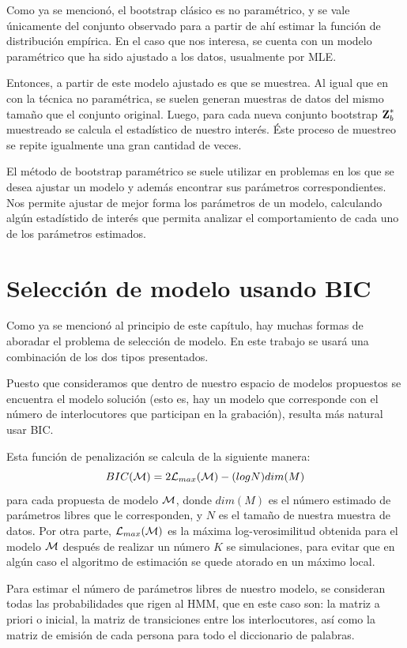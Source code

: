 Como ya se mencionó, el bootstrap clásico es no paramétrico, y se vale únicamente del conjunto observado para a partir de ahí estimar la función de distribución empírica. En el caso que nos interesa, se cuenta con un modelo paramétrico que ha sido ajustado a los datos, usualmente por \ac{MLE}. 

Entonces, a partir de este modelo ajustado es que se muestrea. Al igual que en con la técnica no paramétrica, se suelen generan muestras de datos del mismo tamaño que el conjunto original. Luego, para cada nueva conjunto bootstrap $\textbf{Z}^{*}_b$ muestreado se calcula el estadístico de nuestro interés. Éste proceso de muestreo se repite igualmente una gran cantidad de veces. 

El método de bootstrap paramétrico se suele utilizar en problemas en los que se desea ajustar un modelo y además encontrar sus parámetros correspondientes. Nos permite ajustar de mejor forma los parámetros de un modelo, calculando algún estadístido de interés que permita analizar el comportamiento de cada uno de los parámetros estimados.

\section{Selección de modelo usando BIC}

Como ya se mencionó al principio de este capítulo, hay muchas formas de aboradar el problema de selección de modelo. En este trabajo se usará una combinación de los dos tipos presentados.

Puesto que consideramos que dentro de nuestro espacio de modelos propuestos se encuentra el modelo solución (esto es, hay un modelo que corresponde con el número de interlocutores que participan en la grabación), resulta más natural usar \ac{BIC}.

Esta función de penalización se calcula de la siguiente manera: 
\begin{equation}
BIC(\mathcal{M}) = 2 \mathcal{L}_{max}(\mathcal{M}) - (log N ) dim(M)
\end{equation}
para cada propuesta de modelo $\mathcal{M}$, donde $dim(M)$ es el número estimado de parámetros libres que le corresponden, y $N$ es el tamaño de nuestra muestra de datos. Por otra parte, $\mathcal{L}_{max}(\mathcal{M})$ es la máxima log-verosimilitud obtenida para el modelo $\mathcal{M}$ después de realizar un número $K$ se simulaciones, para evitar que en algún caso el algoritmo de estimación se quede atorado en un máximo local.

Para estimar el número de parámetros libres de nuestro modelo, se consideran todas las probabilidades que rigen al \ac{HMM}, que en este caso son: la matriz a priori o inicial, la matriz de transiciones entre los interlocutores, así como la matriz de emisión de cada persona para todo el diccionario de palabras.

